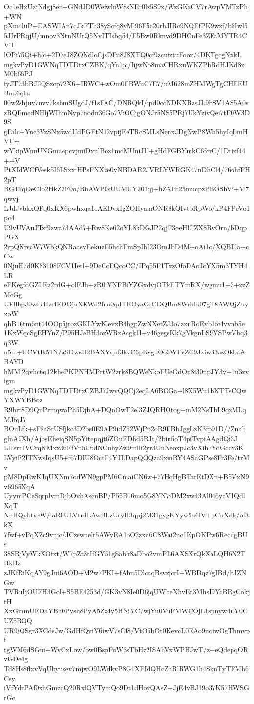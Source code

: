 Oc1eHxUzjNdgj8en+GNdJD0WefwlnW8sNEr0lz5S9x/WzGKzCV7rAwpVMTzPh+WN
pXm4luP+DASWIAn7cJkFTh38yScfq8yMl96F5c20rhJIRc9NQEfPK9wzf/b8Iwl5
5JIrPRqjU/mnov3NtnNUrQ5NvITIsbq54/F5Bw0Rknvd9DHCnFe3ZFaMYTR4CViU
lOPi75Qi+h5i+2D7eJ8ZONdloCjsDFu8J8XTQ0cf9zcuiztuFoox/4DKTgcgNxkL
mgkvPyD1GWNqTDTDtxCZBK/qYa1jc/IijwNo8maCHRxuWKZPbRdHJKd8zM0b66PJ
fyJT73bBJllQSzcp72X6+IBWC+wOm0FBWuC7E7/uM628mZHMWgTgCHEEUBnx6q1x
00w2shjuv7nvv7kshmSUgdJ/f1sFAC/DNRQkI/ipd0ccNDKXBzsJL9bSV1AS5A0s
zRQEmedNHljWIhmNyp7nodn36Go7ViOCjgONJr5NS5PRj7UkYzivQei7tF0W3D9S
gFalc+Ync3VzSNx5wdUdPGFtN12vpijEeTRcSMLsNenxJDgNwP8Wh5hyIqLmHVU+
wYkipWnuUNGmaepcvjmiDxulBoz1mcMUniJU+gHdFGBYmkC6fcrC/1Dtizf44++V
PtXIdWCfVesk5I6LSxxiHPsFNXze0yNBDAR2JVRLYWRGK47nDhCl4/76ohfFH2pT
BG4FqDeCIb2HkZ2F0o/RhAWP0sUUMUY201qj+hZXIit23mucpzPBOShVi+M7qwyj
LJdJvbkxQFq0xKX6pwhxqa1eAEDvxIgZQHyamONR8kQIvtbRpWo/kP4FPeVo1pc4
U9vUVAuJTzf9zwa73AAd7+Rw8Ke62oYL8kDGJP2qjF3oeHlCZX8RvOrn/bDqpPGX
2rpQNrscW7WbkQNRaasvEekuzE5hchEmSpIhI23OmJbD4M+oAi1o/XQBIlla+cCw
0NjuH7d0K83108FCV1Ietl+9DeCcFQcoCC/IPq55F1TxzOfoDAoJcYX5m3TYH4LR
eFKegfdGZLEz2rdG+olFJh+zR0iYNFBiYZGxdyjOTkETYmRX/wgmu1+3+zzZMcGg
UFllbpJ0wfk4Lz4EDOjuXEWd2fno0qdTHOyaOsCDQBm8Wrhlx07gT8AWQjZuyxoW
qhB16tm6nt44OOp5jrozGKLYwKlevxB4hgpZwNXetZJ3o7zxnRoEvb1fc4vvnb5e
1KxWqcSgEHYnZ/P95HJeBH3ozWRzAcgk1l+v46gegsKk7gYkgnLS9YSPwVhq3q3W
n5m+UCVtIk51N/aSDwsH2BAXYquf3kvC6pKsgnOo3WFvZC9Jxiw33asOkbaABAYD
hMMl2qvhc6q12khePKPNHMPrtW2zrk8BQWeNkoFUeOdOp8i30npJY3y+1u3zyigm
mgkvPyD1GWNqTDTDtxCZBJ7JwvQQCj2eqLA6BOGa+l8X5Wu1bKTTsCQwYXWYBBoz
R9hrr8D9QuPrmqwaPh5DjbA+DQnOwT2el3ZJQRHOtog+mM2NsTbL9qzMLqMJfqJ7
BOuLfk+sF8aSrUSfjkc3D2bs0E9AP9idZ62WjPp2oR9EBbJggLzK3fp91D//Znah
glnA9Xh/AjbsEheiqSN5pYitepqjt6ZOuEDhd5RJt/2biu5oT4piTvpfAAgdQi3J
Ll1srr1VCrqKMxx36FfVn5U6dNCuhyZw9mlli2yr3UuNeoxpJo3vXih7YdGccy3K
LVyiF2ITNwsIqsU5+f67DIU8OctF4YJLDapQQQza9xmRY4ASaGPse8Fr3Fe/trMv
pM8DpEwKJqUXNm7odWN9gpPM6CmaiCN6w+77HqHgBTarEtDXn+B5VxN9v6965XqA
UyymPCeSqrplvmDjbOvhAscnBP/P55B16mo5G8YN7iDM2xw43Al046ycV1QdlXqT
NnHQybtxrW/iaR9ULVtrdLAwBLzUsyH3qpj2M31gygKYyw5x6lV+pCuXdk/of3kX
7fwf+vPqXZc9vnjc/JCzswoelr5AWyEA1oO2zxd6C8Wai2uc1KpOKPw6RecdgBUs
38SRjVyWkXOfxt/W7pZt3tIfGY51gSabh8aDbo2vmPL6AXSXrQkXaLQH6N2TRkBz
zJKfRiKqAY9gJui6AOD+M2w7PKI+fAhu5DlcaqBsvzjcrI+WBDqz7gIBd/bJZNGw
TVRuIjOUFH3Gol+S5BF4253d/GK3vN8Ie0D6jqUWbeXhvEc3MhsI9YcBRgCokjtH
XxGmmUEOaYBh0Pysh8PyA5Zz4y5HNiYC/wjYu0VuFMWCOjL1spnyw4uY0CUZ5RQQ
UR9jQSgr3XCdsJw/GdHfQyiY6iwV7sCf8/VtO5bOt0KeycL0EAo9nqiwOgThmvpf
tgWM6dSGui+WvCxLow/bw0BspFuW3sTbHz2ISAhVxWPHJwT/z+eQdepqORvGDe4g
Td8Hs8flxvVqUbyusev7mjwO9LWdkvP8G1XFIdQHcZhRlRWG1h4SknTyTFMh6Csy
iVfYdrPAf0xhGmzoQ20RxlQVTymQo9Dt1dHoyQAsZ+JjE4vBJ19o37K57HWSGrGc
